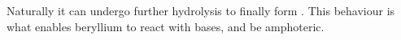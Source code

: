 
			Naturally it can undergo further hydrolysis to finally form . This behaviour
			is what enables beryllium to react with bases, and be amphoteric.































